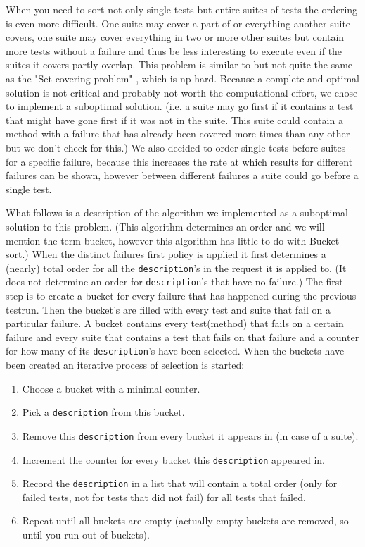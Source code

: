 \documentclass[i2]{oss}
\newcommand{\class}[1]{\texttt{#1}}
\begin{document}
When you need to sort not only single tests but entire suites of tests 
the ordering is even more difficult.
One suite may cover a part of or everything another suite covers, one 
suite may cover everything in two or more other suites but contain more 
tests without a failure and thus be less interesting to execute even if 
the suites it covers partly overlap.
This problem is similar to but not quite the same as the
"Set covering problem" \cite{scp}, which is np-hard.
Because a complete and optimal solution is not critical and probably 
not worth the computational effort, we chose to implement a suboptimal 
solution. (i.e. a suite may go first if it contains a test that might 
have gone first if it was not in the suite. This suite could contain a 
method with a failure that has already been covered more times than any 
other but we don't check for this.)
We also decided to order single tests before suites for a specific 
failure, because this increases the rate at which results for different 
failures can be shown, however between different failures a suite could 
go before a single test.

What follows is a description of the algorithm we implemented as a 
suboptimal solution to this problem.
(This algorithm determines an order and we will mention the term bucket,
however this algorithm has little to do with Bucket sort.)
When the distinct failures first policy is applied it first determines a 
(nearly) total order for all the \class{description}'s in the request it 
is applied to.
(It does not determine an order for \class{description}'s that have no
failure.)
The first step is to create a bucket for every failure that has 
happened during the previous testrun.
Then the bucket's are filled with every test and suite that fail on a 
particular failure.
A bucket contains every test(method) that fails on a certain failure 
and every suite that contains a test that fails on that failure and a 
counter for how many of its \class{description}'s have been selected.
When the buckets have been created an iterative process of selection is
started:
\begin{enumerate}
	\item Choose a bucket with a minimal counter.
	\item Pick a \class{description} from this bucket.
	\item Remove this \class{description} from every bucket it appears in
    		(in case of a suite).
	\item Increment the counter for every bucket this \class{description}
    		appeared in.
	\item Record the \class{description} in a list that will contain a 
    		total order (only for failed tests, not for tests that did 
            not fail) for all tests that failed.
	\item Repeat until all buckets are empty (actually empty buckets 
    		are removed, so until you run out of buckets).
\end{enumerate}
            
\end{document}
